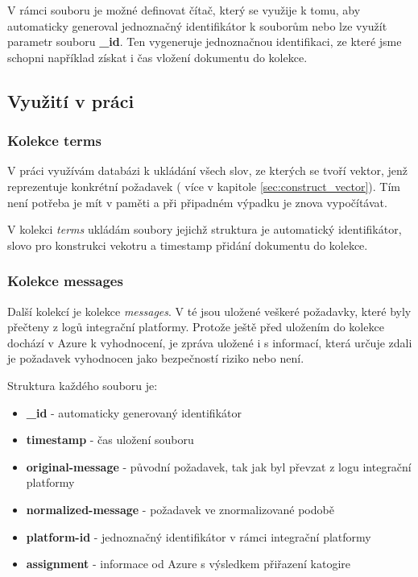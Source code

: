 \documentclass[thesis=M,czech]{FITthesis}[2012/10/20]
\begin{document}
			V rámci souboru je možné definovat čítač, který se využije k tomu, aby automaticky generoval jednoznačný identifikátor k souborům nebo lze využít parametr souboru \textbf{\_id}. Ten vygeneruje jednoznačnou identifikaci, ze které jsme schopni například získat i čas vložení dokumentu do kolekce. 
			
		\subsection{Využití v práci}
			\subsubsection{Kolekce terms}
			V práci využívám databázi k ukládání všech slov, ze kterých se tvoří vektor, jenž reprezentuje konkrétní požadavek ( více v kapitole \ref{sec:construct_vector}). Tím není potřeba je mít v paměti a při připadném výpadku je znova vypočítávat.
			
			 V kolekci \textit{terms} ukládám soubory jejichž struktura je automatický identifikátor, slovo pro konstrukci vekotru a timestamp přidání dokumentu do kolekce.
			
			\subsubsection{Kolekce messages}
			Další kolekcí je kolekce \textit{messages}. V té jsou uložené veškeré požadavky, které byly přečteny z logů integrační platformy. Protože ještě před uložením do kolekce dochází v Azure k vyhodnocení, je zpráva uložené i s informací, která určuje zdali je požadavek vyhodnocen jako bezpečností riziko nebo není. 
			
			Struktura každého souboru je: 
			
			\begin{itemize} 
				\item \textbf{\_id} - automaticky generovaný identifikátor
				\item \textbf{timestamp} - čas uložení souboru
				\item \textbf{original-message} - původní požadavek, tak jak byl převzat z logu integrační platformy
				\item \textbf{normalized-message} - požadavek ve znormalizované podobě
				\item \textbf{platform-id} - jednoznačný identifikátor v rámci integrační platformy
				\item \textbf{assignment} - informace od Azure s výsledkem přiřazení katogire 	
			\end{itemize}
		
\end{document}
